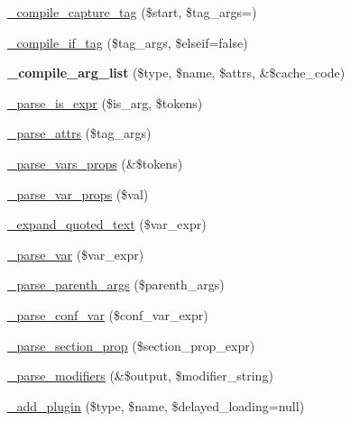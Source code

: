 \begin{DoxyCompactItemize}
\item 
\mbox{\hyperlink{class_smarty___compiler_aa753b496a05ea7af01406f98c508edc9}{\+\_\+compile\+\_\+capture\+\_\+tag}} (\$start, \$tag\+\_\+args=\textquotesingle{}\textquotesingle{})
\item 
\mbox{\hyperlink{class_smarty___compiler_a75459b547539c23758a5e3c8128651b0}{\+\_\+compile\+\_\+if\+\_\+tag}} (\$tag\+\_\+args, \$elseif=false)
\item 
\mbox{\label{class_smarty___compiler_a706dfb0a042d70b407153241653da0c6}} 
{\bfseries \+\_\+compile\+\_\+arg\+\_\+list} (\$type, \$name, \$attrs, \&\$cache\+\_\+code)
\item 
\mbox{\hyperlink{class_smarty___compiler_ad03b182e7b84d4a40218ae9b4f8080de}{\+\_\+parse\+\_\+is\+\_\+expr}} (\$is\+\_\+arg, \$tokens)
\item 
\mbox{\hyperlink{class_smarty___compiler_a226e4f37cafc2d535b3ea7ccad565d6a}{\+\_\+parse\+\_\+attrs}} (\$tag\+\_\+args)
\item 
\mbox{\hyperlink{class_smarty___compiler_a2ab9cbfebcdbc2807c684de842278295}{\+\_\+parse\+\_\+vars\+\_\+props}} (\&\$tokens)
\item 
\mbox{\hyperlink{class_smarty___compiler_a7925236cb19a53ba4fb17ff51f164eb9}{\+\_\+parse\+\_\+var\+\_\+props}} (\$val)
\item 
\mbox{\hyperlink{class_smarty___compiler_ad242e9af4f6ee1524acdca2ee529f87a}{\+\_\+expand\+\_\+quoted\+\_\+text}} (\$var\+\_\+expr)
\item 
\mbox{\hyperlink{class_smarty___compiler_aeeaa2b6e8325e1aa932d45a189e8bce6}{\+\_\+parse\+\_\+var}} (\$var\+\_\+expr)
\item 
\mbox{\hyperlink{class_smarty___compiler_a77a6bbc6a17e76b941c3cefeee9c7b2d}{\+\_\+parse\+\_\+parenth\+\_\+args}} (\$parenth\+\_\+args)
\item 
\mbox{\hyperlink{class_smarty___compiler_a3887c9771f60165babae612a4595d1fc}{\+\_\+parse\+\_\+conf\+\_\+var}} (\$conf\+\_\+var\+\_\+expr)
\item 
\mbox{\hyperlink{class_smarty___compiler_a4509a57efd495c63579f7447c2d28972}{\+\_\+parse\+\_\+section\+\_\+prop}} (\$section\+\_\+prop\+\_\+expr)
\item 
\mbox{\hyperlink{class_smarty___compiler_afd43133d5f05a358b1a76cf60805119e}{\+\_\+parse\+\_\+modifiers}} (\&\$output, \$modifier\+\_\+string)
\item 
\mbox{\hyperlink{class_smarty___compiler_aaaf68202b4841dc6c783be9b8911d36b}{\+\_\+add\+\_\+plugin}} (\$type, \$name, \$delayed\+\_\+loading=null)

\end{DoxyCompactItemize}
